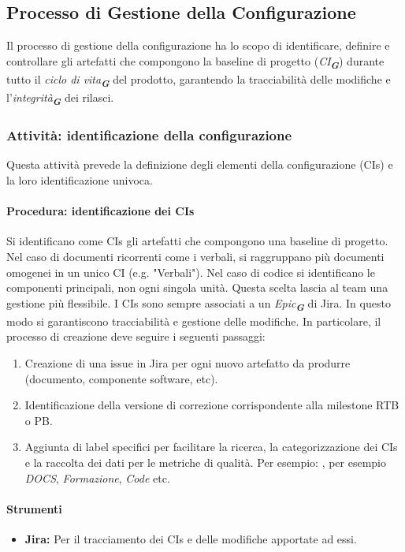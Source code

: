 \documentclass[a4paper,12pt]{article}
\newcommand{\glossario}[1]{\textit{#1}\textsubscript{\textbf{\textit{\textcolor{lightblack}{G}}}}}
\begin{document}
\subsection{Processo di Gestione della Configurazione} \label{configurazione}
Il processo di gestione della configurazione ha lo scopo di identificare,
definire e controllare gli artefatti che compongono la baseline di progetto
(\glossario{CI}) durante tutto il \glossario{ciclo di vita} del prodotto,
garantendo la tracciabilità delle modifiche e l'\glossario{integrità} dei rilasci.

\subsubsection{Attività: identificazione della configurazione}
Questa attività prevede la definizione degli elementi della configurazione
(CIs) e la loro identificazione univoca.
\paragraph{Procedura: identificazione dei CIs} \label{identificazioneCIs}
Si identificano come CIs gli artefatti che compongono una baseline di progetto.
Nel caso di documenti ricorrenti come i verbali, si raggruppano più documenti omogenei in un unico CI (e.g. "Verbali").
Nel caso di codice si identificano le componenti principali, non ogni singola unità.
Questa scelta lascia al team una gestione più flessibile.
I CIs sono sempre associati a un \glossario{Epic} di Jira. In questo modo si garantiscono tracciabilità e gestione delle modifiche. In particolare, il processo di creazione deve seguire i seguenti passaggi:
\begin{enumerate}
    \item Creazione di una issue in Jira per ogni nuovo artefatto da produrre (documento,
          componente software, etc).
    \item Identificazione della versione di correzione corrispondente alla milestone RTB
          o PB.
    \item Aggiunta di label specifici per facilitare la ricerca, la categorizzazione dei
          CIs e la raccolta dei dati per le metriche di qualità. Per esempio: , per
          esempio \textit{DOCS}, \textit{Formazione}, \textit{Code} etc.
\end{enumerate}
\paragraph{Strumenti}
\begin{itemize}
    \item \textbf{Jira:} Per il tracciamento dei CIs e delle modifiche apportate ad essi.
\end{itemize}
\end{document}
